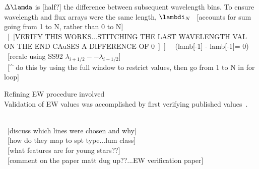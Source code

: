 $\Delta\lamda$ is [half?] the difference between subsequent wavelength bins.  To ensure wavelength and flux arrays were the same length, $\lambdi_{N}$
~[accounts for sum going from 1 to N, rather than 0 to N]\\
~[~[VERIFY THIS WORKS...STITCHING THE LAST WAVELENGTH VAL ON THE END CAuSES A DIFFERENCE OF 0~]~] ~~(lamb[-1] - lamb[-1]= 0)\\


~[recalc using SS92 $\lambda_{i+1/2} -- \lambda_{i-1/2}$]\\
~[^ do this by using the full window to restrict values, then go from 1 to N in for loop]

Refining EW procedure involved \\
Validation of EW values was accomplished by first verifying published values~\cite{Rayner_2009}.  

~\\~[discuss which lines were chosen and why]\\
~[how do they map to spt type...lum class]\\
~[what features are for young stars??]\\
~[comment on the paper matt dug up??...EW verification paper]


